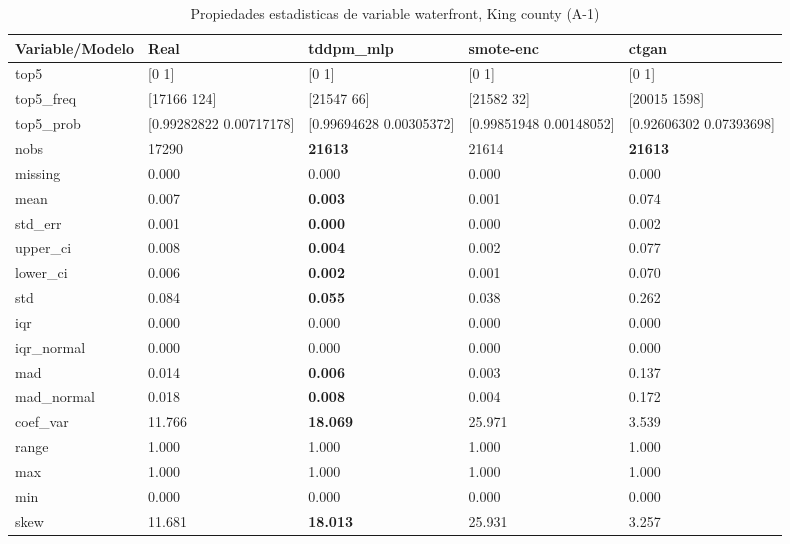\begin{table}[H]
\centering
\fontsize{8}{14}\selectfont
\caption{Propiedades  estadisticas de variable waterfront, King county (A-1)}
\label{table-stats-king county-a-1-waterfront}
\begin{tabular}{|l|m{10em}|m{10em}|m{10em}|m{10em}|}
\hline
 \rowcolor[gray]{0.8}
Variable/Modelo & Real & tddpm\_mlp & smote-enc & ctgan \\
\hline top5 & [0 1] & [0 1] & [0 1] & [0 1] \\
\hline top5\_freq & [17166   124] & [21547    66] & [21582    32] & [20015  1598] \\
\hline top5\_prob & [0.99282822 0.00717178] & [0.99694628 0.00305372] & [0.99851948 0.00148052] & [0.92606302 0.07393698] \\
\hline nobs & 17290 & \bfseries 21613 & \cellcolor[rgb]{0.9, 0.54, 0.52} 21614 & \bfseries 21613 \\
\hline missing & 0.000 & 0.000 & 0.000 & 0.000 \\
\hline mean & 0.007 & \bfseries 0.003 & 0.001 & \cellcolor[rgb]{0.9, 0.54, 0.52} 0.074 \\
\hline std\_err & 0.001 & \bfseries 0.000 & 0.000 & \cellcolor[rgb]{0.9, 0.54, 0.52} 0.002 \\
\hline upper\_ci & 0.008 & \bfseries 0.004 & 0.002 & \cellcolor[rgb]{0.9, 0.54, 0.52} 0.077 \\
\hline lower\_ci & 0.006 & \bfseries 0.002 & 0.001 & \cellcolor[rgb]{0.9, 0.54, 0.52} 0.070 \\
\hline std & 0.084 & \bfseries 0.055 & 0.038 & \cellcolor[rgb]{0.9, 0.54, 0.52} 0.262 \\
\hline iqr & 0.000 & 0.000 & 0.000 & 0.000 \\
\hline iqr\_normal & 0.000 & 0.000 & 0.000 & 0.000 \\
\hline mad & 0.014 & \bfseries 0.006 & 0.003 & \cellcolor[rgb]{0.9, 0.54, 0.52} 0.137 \\
\hline mad\_normal & 0.018 & \bfseries 0.008 & 0.004 & \cellcolor[rgb]{0.9, 0.54, 0.52} 0.172 \\
\hline coef\_var & 11.766 & \bfseries 18.069 & \cellcolor[rgb]{0.9, 0.54, 0.52} 25.971 & 3.539 \\
\hline range & 1.000 & 1.000 & 1.000 & 1.000 \\
\hline max & 1.000 & 1.000 & 1.000 & 1.000 \\
\hline min & 0.000 & 0.000 & 0.000 & 0.000 \\
\hline skew & 11.681 & \bfseries 18.013 & \cellcolor[rgb]{0.9, 0.54, 0.52} 25.931 & 3.257 \\

\end{tabular}
\end{table}
